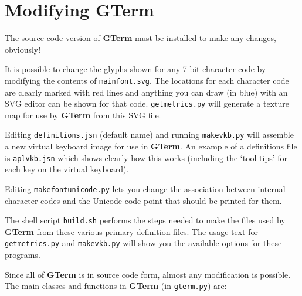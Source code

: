 \documentclass[a4paper,twoside,11pt]{article}
\newcommand{\newpara}{\par\vspace{4mm}\noindent}
\begin{document}
\section{Modifying \textbf{GTerm}}
The source code version of \textbf{GTerm} must be installed to make any changes, obviously!
\newpara
It is possible to change the glyphs shown for any 7-bit character code by modifying the contents of
\texttt{mainfont.svg}. The locations for each character code are clearly marked with red lines and 
anything you can draw (in blue) with an SVG editor can be shown for that code. \texttt{getmetrics.py} will generate
a texture map for use by \textbf{GTerm} from this SVG file.
\newpara
Editing \texttt{definitions.jsn} (default name) and running \texttt{makevkb.py} will assemble a new virtual keyboard image for
use in \textbf{GTerm}. An example of a definitions file is \texttt{aplvkb.jsn} which shows clearly how this works (including the
`tool tips' for each key on the virtual keyboard).
\newpara
Editing \texttt{makefontunicode.py} lets you change the association between internal character codes and the Unicode
code point that should be printed for them.
\newpara
The shell script \texttt{build.sh} performs the steps needed to make the files used by \textbf{GTerm} from these various primary
definition files. The usage text for \texttt{getmetrics.py} and \texttt{makevkb.py} will show you the available options
for these programs.
\newpara
Since all of \textbf{GTerm} is in source code form, almost any modification is possible. The main classes and functions in
\textbf{GTerm} (in \texttt{gterm.py}) are:
\end{document}
